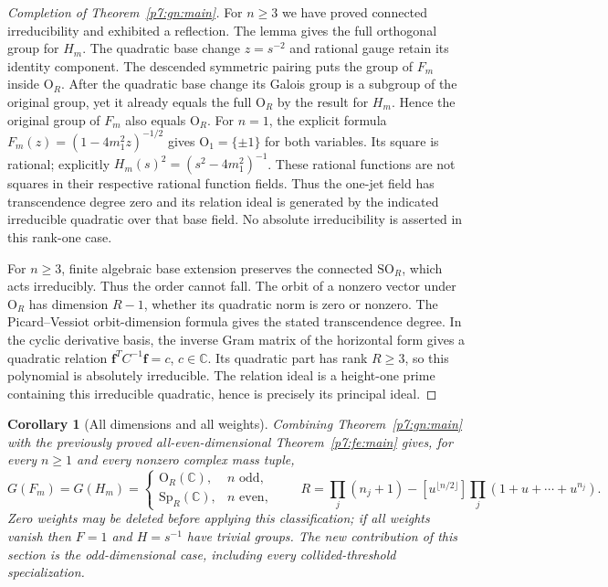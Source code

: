 \documentclass[11pt,a4paper]{article}
\newtheorem{corollary}[theorem]{Corollary}
\theoremstyle{definition}
\theoremstyle{remark}
\numberwithin{equation}{section}
\begin{document}
\begin{proof}[Completion of Theorem~\ref{p7:gn:main}]
For $n\ge3$ we have proved connected irreducibility and exhibited
a reflection. The lemma gives the full orthogonal group for $H_m$.
The quadratic base change $z=s^{-2}$ and rational gauge retain its
identity component. The descended symmetric pairing puts the group
of $F_m$ inside $\mathrm O_R$. After the quadratic base change its
Galois group is a subgroup of the original group, yet it already
equals the full $\mathrm O_R$ by the result for $H_m$. Hence the
original group of $F_m$ also equals $\mathrm O_R$.
For $n=1$, the explicit formula
$F_m(z)=(1-4m_1^2z)^{-1/2}$ gives $\mathrm O_1=\{\pm1\}$
for both variables. Its square is rational; explicitly
$H_m(s)^2=(s^2-4m_1^2)^{-1}$. These rational functions are not
squares in their respective rational function fields. Thus the
one-jet field has transcendence degree zero and its relation ideal
is generated by the indicated irreducible quadratic over that
base field. No absolute irreducibility is asserted in this
rank-one case.

For $n\ge3$, finite algebraic base extension preserves the connected
$\mathrm{SO}_R$, which acts irreducibly. Thus the order cannot fall.
The orbit of a nonzero vector under $\mathrm O_R$ has dimension
$R-1$, whether its quadratic norm is zero or nonzero. The
Picard--Vessiot orbit-dimension formula gives the stated
transcendence degree. In the cyclic derivative basis, the inverse
Gram matrix of the horizontal form gives a quadratic relation
$\mathbf f^{T}C^{-1}\mathbf f=c$, $c\in\mathbb C$.
Its quadratic part has rank $R\ge3$, so this polynomial is
absolutely irreducible. The relation ideal is a height-one prime
containing this irreducible quadratic, hence is precisely its
principal ideal.
\end{proof}

\begin{corollary}[All dimensions and all weights]
Combining Theorem~\ref{p7:gn:main} with the previously proved
all-even-dimensional Theorem~\ref{p7:fe:main} gives, for every $n\ge1$ and every
nonzero complex mass tuple,
\[
 G(F_m)=G(H_m)=
 \begin{cases}
 \mathrm O_R(\mathbb C),&n\text{ odd},\\
 \mathrm{Sp}_R(\mathbb C),&n\text{ even},
 \end{cases}
 \qquad
 R=\prod_j(n_j+1)-[u^{\lfloor n/2\rfloor}]
                         \prod_j(1+u+\cdots+u^{n_j}).
\]
Zero weights may be deleted before applying this classification;
if all weights vanish then $F=1$ and $H=s^{-1}$ have trivial groups.
The new contribution of this section is the odd-dimensional case,
including every collided-threshold specialization.
\end{corollary}
\end{document}
